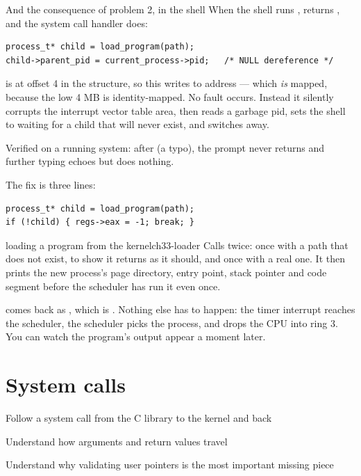 \begin{danger}{And the consequence of problem 2, in the shell}
When the shell runs ,  returns , and the system
call handler does:
\begin{lstlisting}[style=c]
process_t* child = load_program(path);
child->parent_pid = current_process->pid;   /* NULL dereference */
\end{lstlisting}
 is at offset 4 in the structure, so this writes to address  --- which
\emph{is} mapped, because the low 4 MB is identity-mapped. No fault occurs. Instead it silently
corrupts the interrupt vector table area, then reads a garbage pid, sets the shell to
 waiting for a child that will never exist, and switches away.

 Verified on
a running system: after  (a typo), the prompt never returns and further
typing echoes but does nothing.

The fix is three lines:
\begin{lstlisting}[style=c]
process_t* child = load_program(path);
if (!child) { regs->eax = -1; break; }
\end{lstlisting}
\end{danger}

\begin{recipe}{loading a program from the kernel}{ch33-loader}
Calls  twice: once with a path that does not exist, to show it returns
 as it should, and once with a real one. It then prints the new process's page directory,
entry point, stack pointer and code segment before the scheduler has run it even once.

 comes back as , which is . Nothing else has to happen: the timer
interrupt reaches the scheduler, the scheduler picks the process, and  drops the CPU into
ring 3. You can watch the program's output appear a moment later.
\end{recipe}

\chapter{System calls}

\begin{goals}
  \item Follow a system call from the C library to the kernel and back
  \item Understand how arguments and return values travel
  \item Understand why validating user pointers is the most important missing piece
\end{goals}

